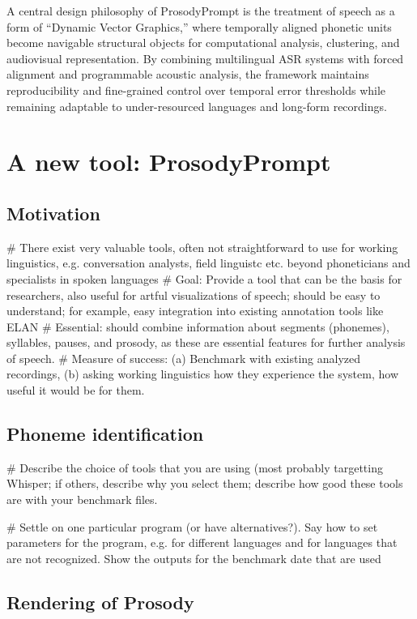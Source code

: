 A central design philosophy of ProsodyPrompt is the treatment of speech as a form of ``Dynamic Vector Graphics,'' where temporally aligned phonetic units become navigable structural objects for computational analysis, clustering, and audiovisual representation. By combining multilingual ASR systems with forced alignment and programmable acoustic analysis, the framework maintains reproducibility and fine-grained control over temporal error thresholds while remaining adaptable to under-resourced languages and long-form recordings.


\chapter{A new tool: ProsodyPrompt}
\label{speechprint}

\section{Motivation}

# There exist very valuable tools, often not straightforward to use for working linguistics, e.g. conversation analysts, field linguistc etc. beyond phoneticians and specialists in spoken languages
# Goal: Provide a tool that can be the basis for researchers, also useful for artful visualizations of speech; should be easy to understand; for example, easy integration into existing annotation tools like ELAN
# Essential: should combine information about segments (phonemes), syllables, pauses, and prosody, as these are essential features for further analysis of speech. 
# Measure of success: (a) Benchmark with existing analyzed recordings, (b) asking working linguistics how they experience the system, how useful it would be for them. 

\section{Phoneme identification}

# Describe the choice of tools that you are using (most probably targetting Whisper; if others, describe why you select them; describe how good these tools are with your benchmark files. 

# Settle on one particular program (or have alternatives?). Say how to set parameters for the program, e.g. for different languages and for languages that are not recognized. Show the outputs for the benchmark date that are used

\section{Rendering of Prosody}

